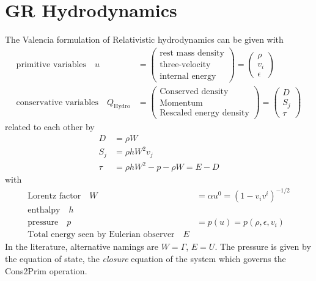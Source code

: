 \documentclass[a4paper]{article}
\newcommand{\desc}[1]{\text{#1}\quad}
\newcommand{\hydro}{\text{Hydro}}
\begin{document}
\section{GR Hydrodynamics}
The Valencia formulation of Relativistic hydrodynamics can be given
with
\begin{align}
\label{eq.grhd.prim}
\text{primitive variables}\quad u &=
\begin{pmatrix}
\text{rest mass density} \\
\text{three-velocity} \\
\text{internal energy}
\end{pmatrix}
= \begin{pmatrix} \rho \\ v_i \\ \epsilon \end{pmatrix}
\\
\label{eq.grhd.cons}
\text{conservative variables}\quad Q_\hydro
&=
\begin{pmatrix}
\text{Conserved density} \\
\text{Momentum} \\
\text{Rescaled energy density}
\end{pmatrix}
=
\begin{pmatrix} D \\ S_j \\ \tau \end{pmatrix}
\end{align}
related to each other by
\begin{align}
D &= \rho W \\
S_j &= \rho h W^2 v_j \\
\tau &= \rho h W^2 - p - \rho W = E - D
\end{align}
with
\begin{align}
\desc{Lorentz factor}
W&=\alpha u^0 = (1 - v_i v^i)^{-1/2}
\\
\desc{enthalpy} h &
\\
\desc{pressure} p &= p(u) = p(\rho,\epsilon, v_i)
\\
\desc{Total energy seen by Eulerian observer} E
\end{align}
In the literature, alternative namings are $W=\Gamma$, $E=U$.
The pressure is given by the equation of state, the \emph{closure}
equation of the system which governs the Cons2Prim operation.
\end{document}
